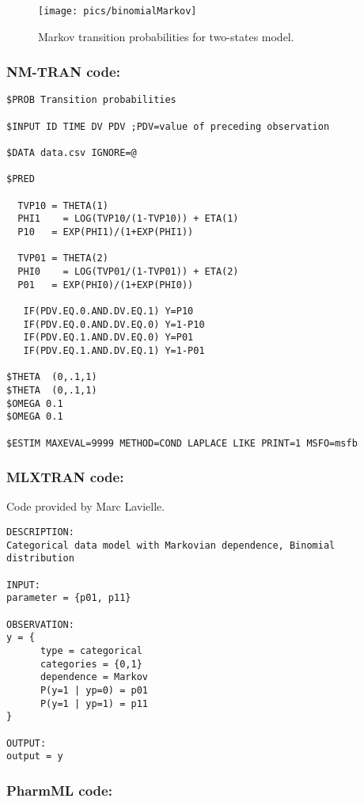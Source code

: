 \begin{figure}[htbp!]
\texttt{[image: pics/binomialMarkov]} 
\caption{Markov transition probabilities for two-states model.}
\label{fig:binomialMarkov}
\end{figure}


\subsubsection{NM-TRAN code:}

\myStartLine
\lstset{language=NONMEMdataSet}
\begin{lstlisting}
$PROB Transition probabilities

$INPUT ID TIME DV PDV ;PDV=value of preceding observation

$DATA data.csv IGNORE=@ 

$PRED

  TVP10 = THETA(1)                    
  PHI1    = LOG(TVP10/(1-TVP10)) + ETA(1)  
  P10   = EXP(PHI1)/(1+EXP(PHI1))
  
  TVP01 = THETA(2)                    
  PHI0    = LOG(TVP01/(1-TVP01)) + ETA(2)  
  P01   = EXP(PHI0)/(1+EXP(PHI0))
   
   IF(PDV.EQ.0.AND.DV.EQ.1) Y=P10
   IF(PDV.EQ.0.AND.DV.EQ.0) Y=1-P10 
   IF(PDV.EQ.1.AND.DV.EQ.0) Y=P01 
   IF(PDV.EQ.1.AND.DV.EQ.1) Y=1-P01 
   
$THETA  (0,.1,1)   
$THETA  (0,.1,1)   
$OMEGA 0.1 
$OMEGA 0.1  

$ESTIM MAXEVAL=9999 METHOD=COND LAPLACE LIKE PRINT=1 MSFO=msfb
\end{lstlisting}
\myEndLine

\subsubsection{MLXTRAN code:}
Code provided by Marc Lavielle. 

\myStartLine
\lstset{language=MLXTRANcode}
\begin{lstlisting}
DESCRIPTION:
Categorical data model with Markovian dependence, Binomial distribution

INPUT:
parameter = {p01, p11}

OBSERVATION:
y = {
      type = categorical
      categories = {0,1}
      dependence = Markov
      P(y=1 | yp=0) = p01
      P(y=1 | yp=1) = p11
}

OUTPUT:
output = y
\end{lstlisting}
\myEndLine

\subsubsection{PharmML code:}

